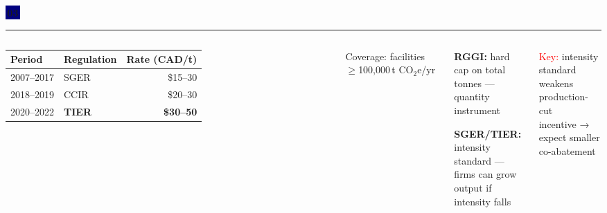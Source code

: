 \documentclass[aspectratio=169,12pt]{beamer}
\newcommand{\badge}[2][Navy]{%
  \colorbox{#1}{\color{white}\,\textbf{\small #2}\,}%
}
\begin{document}
\begin{frame}
\badge{03}
\vspace{0.5em}\par
{\color{Blue}\rule{\linewidth}{0.8pt}}\par
\vspace{0.4em}

\begin{columns}[T]
\begin{tabular}{llr}
\toprule
\small Period & \small Regulation & \small Rate (CAD/t) \\
\midrule
2007--2017 & SGER & \$15--30 \\
2018--2019 & CCIR & \$20--30 \\
2020--2022 & \textbf{TIER} & \textbf{\$30--50} \\
\bottomrule
\end{tabular}

\vspace{0.7em}
{\small Coverage: facilities $\geq$100,000\,t CO$_2$e/yr}

\begin{tcolorbox}[statbox,title={\small RGGI vs.\ SGER/TIER}]
\textbf{RGGI:} hard cap on total\\
tonnes — quantity instrument

\vspace{4pt}
\textbf{SGER/TIER:} intensity\\
standard — firms can grow\\
output if intensity falls
\end{tcolorbox}

\vspace{0.4em}
{\small \textcolor{Red}{Key:} intensity standard\\
weakens production-cut\\
incentive → expect smaller\\
co-abatement}
\end{columns}
\end{frame}
\end{document}
